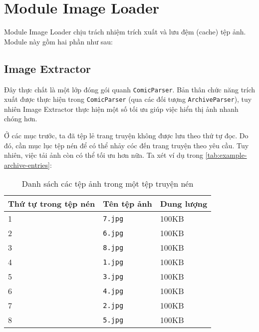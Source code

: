 \documentclass[../../../../thesis]{subfiles}
\begin{document}
\section{Module Image Loader}\label{sec:module-image-loader}

Module Image Loader chịu trách nhiệm trích xuất và lưu đệm (cache) tệp ảnh.
Module này gồm hai phần như sau:



\subsection{Image Extractor}\label{sec:image-extractor}

Đây thực chất là một lớp đóng gói quanh \texttt{ComicParser}. Bản thân chức năng
trích xuất được thực hiện trong \texttt{ComicParser} (qua các đối tượng
\texttt{ArchiveParser}), tuy nhiên Image Extractor thực hiện một số tối ưu giúp
việc hiển thị ảnh nhanh chóng hơn.

Ở các mục trước, ta đã tệp lẻ trang truyện không được lưu theo thứ tự đọc. Do
đó, cần mục lục tệp nén để có thể nhảy cóc đến trang truyện theo yêu cầu. Tuy
nhiên, việc tải ảnh còn có thể tối ưu hơn nữa. Ta xét ví dụ trong
\autoref{tab:example-archive-entries}:

\begin{table}[H]
    \centering
    \caption{Danh sách các tệp ảnh trong một tệp truyện nén}
    \label{tab:example-archive-entries}
    \begin{tabular}{l l l}
        \toprule
        Thứ tự trong tệp nén & Tên tệp ảnh & Dung lượng \\
        \midrule
        1 & \texttt{7.jpg} & 100KB \\
        2 & \texttt{6.jpg} & 100KB \\
        3 & \texttt{8.jpg} & 100KB \\
        4 & \texttt{1.jpg} & 100KB \\
        5 & \texttt{3.jpg} & 100KB \\
        6 & \texttt{4.jpg} & 100KB \\
        7 & \texttt{2.jpg} & 100KB \\
        8 & \texttt{5.jpg} & 100KB \\
        \bottomrule
    \end{tabular}
\end{table}
\end{document}
